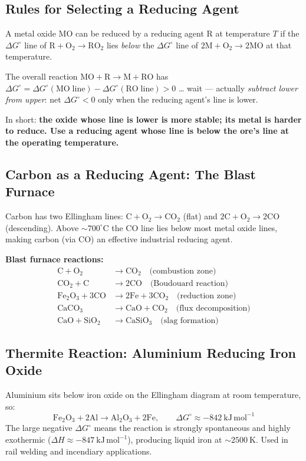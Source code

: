 \documentclass[12pt,a4paper]{article}
\begin{document}
\subsection{Rules for Selecting a Reducing Agent}
\begin{tcolorbox}[formulabox, title={Ellingham Selection Rule}]
A metal oxide $\mathrm{MO}$ can be reduced by a reducing agent $\mathrm{R}$ at temperature $T$ if the $\Delta G^\circ$ line of $\mathrm{R+O_2 \to RO_2}$ lies \emph{below} the $\Delta G^\circ$ line of $\mathrm{2M+O_2 \to 2MO}$ at that temperature.

The overall reaction $\mathrm{MO + R \to M + RO}$ has $\Delta G^\circ = \Delta G^\circ(\mathrm{MO\;line}) - \Delta G^\circ(\mathrm{RO\;line}) > 0$ … wait --- actually \emph{subtract lower from upper}: net $\Delta G^\circ < 0$ only when the reducing agent's line is lower.

In short: \textbf{the oxide whose line is lower is more stable; its metal is harder to reduce. Use a reducing agent whose line is below the ore's line at the operating temperature.}
\end{tcolorbox}

\subsection{Carbon as a Reducing Agent: The Blast Furnace}
Carbon has two Ellingham lines: $\mathrm{C + O_2 \to CO_2}$ (flat) and $\mathrm{2C + O_2 \to 2CO}$ (descending). Above $\sim 700^\circ\mathrm{C}$ the CO line lies below most metal oxide lines, making carbon (via CO) an effective industrial reducing agent.

\textbf{Blast furnace reactions:}
\begin{align*}
\mathrm{C + O_2} &\to \mathrm{CO_2} \quad \text{(combustion zone)}\\
\mathrm{CO_2 + C} &\to \mathrm{2CO} \quad \text{(Boudouard reaction)}\\
\mathrm{Fe_2O_3 + 3CO} &\to \mathrm{2Fe + 3CO_2} \quad \text{(reduction zone)}\\
\mathrm{CaCO_3} &\to \mathrm{CaO + CO_2} \quad \text{(flux decomposition)}\\
\mathrm{CaO + SiO_2} &\to \mathrm{CaSiO_3} \quad \text{(slag formation)}
\end{align*}

\subsection{Thermite Reaction: Aluminium Reducing Iron Oxide}
Aluminium sits below iron oxide on the Ellingham diagram at room temperature, so:
\[
\mathrm{Fe_2O_3 + 2Al \to Al_2O_3 + 2Fe}, \qquad \Delta G^\circ \approx -842\ \mathrm{kJ\,mol^{-1}}
\]
The large negative $\Delta G^\circ$ means the reaction is strongly spontaneous and highly exothermic ($\Delta H \approx -847\ \mathrm{kJ\,mol^{-1}}$), producing liquid iron at $\sim 2500\ \mathrm{K}$. Used in rail welding and incendiary applications.
\end{document}
